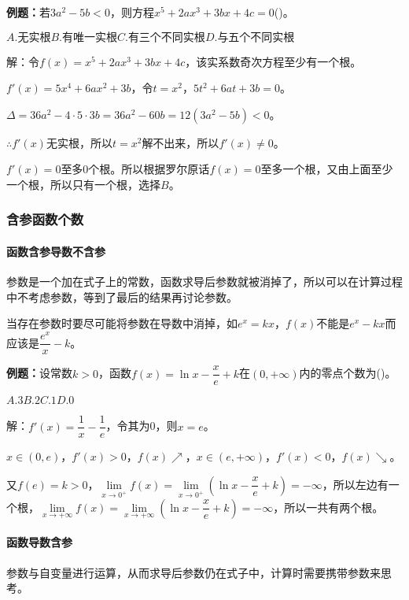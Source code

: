 \documentclass[UTF8, 12pt]{ctexart}
\begin{document}
\textbf{例题：}若$3a^2-5b<0$，则方程$x^5+2ax^3+3bx+4c=0$()。

$A.\text{无实根}$\qquad$B.\text{有唯一实根}$\qquad$C.\text{有三个不同实根}$\qquad$D.\text{与五个不同实根}$

解：令$f(x)=x^5+2ax^3+3bx+4c$，该实系数奇次方程至少有一个根。

$f'(x)=5x^4+6ax^2+3b$，令$t=x^2$，$5t^2+6at+3b=0$。

$\Delta=36a^2-4\cdot5\cdot3b=36a^2-60b=12(3a^2-5b)<0$。

$\therefore f'(x)$无实根，所以$t=x^2$解不出来，所以$f'(x)\neq0$。

$f'(x)=0$至多0个根。所以根据罗尔原话$f(x)=0$至多一个根，又由上面至少一个根，所以只有一个根，选择$B$。

\subsubsection{含参函数个数}

\paragraph{函数含参导数不含参} \leavevmode \medskip

参数是一个加在式子上的常数，函数求导后参数就被消掉了，所以可以在计算过程中不考虑参数，等到了最后的结果再讨论参数。

当存在参数时要尽可能将参数在导数中消掉，如$e^x=kx$，$f(x)$不能是$e^x-kx$而应该是$\dfrac{e^x}{x}-k$。

\textbf{例题：}设常数$k>0$，函数$f(x)=\ln x-\dfrac{x}{e}+k$在$(0,+\infty)$内的零点个数为()。

$A.3$\qquad$B.2$\qquad$C.1$\qquad$D.0$

解：$f'(x)=\dfrac{1}{x}-\dfrac{1}{e}$，令其为0，则$x=e$。

$x\in(0,e)$，$f'(x)>0$，$f(x)\nearrow$，$x\in(e,+\infty)$，$f'(x)<0$，$f(x)\searrow$。

又$f(e)=k>0$，$\lim\limits_{x\to0^+}f(x)=\lim\limits_{x\to0^+}(\ln x-\dfrac{x}{e}+k)=-\infty$，所以左边有一个根，$\lim\limits_{x\to+\infty}f(x)=\lim\limits_{x\to+\infty}(\ln x-\dfrac{x}{e}+k)=-\infty$，所以一共有两个根。

\paragraph{函数导数含参} \leavevmode \medskip

参数与自变量进行运算，从而求导后参数仍在式子中，计算时需要携带参数来思考。
\end{document}
